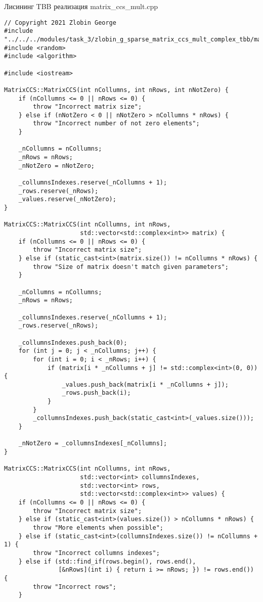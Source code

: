 \documentclass{report}
\begin{document}
Лисининг TBB реализация matrix\_ccs\_mult.cpp
\begin{lstlisting}
// Copyright 2021 Zlobin George
#include "../../../modules/task_3/zlobin_g_sparse_matrix_ccs_mult_complex_tbb/matrix_ccs_mult.h"
#include <random>
#include <algorithm>

#include <iostream>

MatrixCCS::MatrixCCS(int nCollumns, int nRows, int nNotZero) {
    if (nCollumns <= 0 || nRows <= 0) {
        throw "Incorrect matrix size";
    } else if (nNotZero < 0 || nNotZero > nCollumns * nRows) {
        throw "Incorrect number of not zero elements";
    }

    _nCollumns = nCollumns;
    _nRows = nRows;
    _nNotZero = nNotZero;

    _collumnsIndexes.reserve(_nCollumns + 1);
    _rows.reserve(_nRows);
    _values.reserve(_nNotZero);
}

MatrixCCS::MatrixCCS(int nCollumns, int nRows,
                     std::vector<std::complex<int>> matrix) {
    if (nCollumns <= 0 || nRows <= 0) {
        throw "Incorrect matrix size";
    } else if (static_cast<int>(matrix.size()) != nCollumns * nRows) {
        throw "Size of matrix doesn't match given parameters";
    }

    _nCollumns = nCollumns;
    _nRows = nRows;

    _collumnsIndexes.reserve(_nCollumns + 1);
    _rows.reserve(_nRows);

    _collumnsIndexes.push_back(0);
    for (int j = 0; j < _nCollumns; j++) {
        for (int i = 0; i < _nRows; i++) {
            if (matrix[i * _nCollumns + j] != std::complex<int>(0, 0)) {
                _values.push_back(matrix[i * _nCollumns + j]);
                _rows.push_back(i);
            }
        }
        _collumnsIndexes.push_back(static_cast<int>(_values.size()));
    }

    _nNotZero = _collumnsIndexes[_nCollumns];
}

MatrixCCS::MatrixCCS(int nCollumns, int nRows,
                     std::vector<int> collumnsIndexes,
                     std::vector<int> rows,
                     std::vector<std::complex<int>> values) {
    if (nCollumns <= 0 || nRows <= 0) {
        throw "Incorrect matrix size";
    } else if (static_cast<int>(values.size()) > nCollumns * nRows) {
        throw "More elements when possible";
    } else if (static_cast<int>(collumnsIndexes.size()) != nCollumns + 1) {
        throw "Incorrect collumns indexes";
    } else if (std::find_if(rows.begin(), rows.end(),
               [&nRows](int i) { return i >= nRows; }) != rows.end()) {
        throw "Incorrect rows";
    }


\end{lstlisting}
\end{document}

